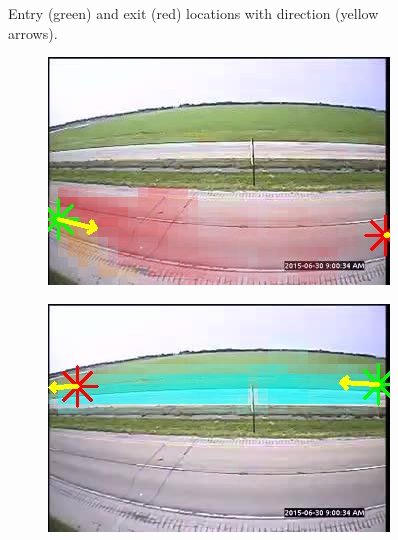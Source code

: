 \begin{figure}
\begin{subfigure}{0.32\linewidth}
        \end{subfigure}
        \caption{Entry (green) and exit (red) locations with direction (yellow arrows).}
        \label{fig:entry-exit-app-1}
\end{figure}
\begin{figure}
    \centering
        \begin{subfigure}{0.32\linewidth}
            \includegraphics[width=\linewidth]{./img/scene_learning/res/245837/245837-0.jpg}
        \end{subfigure}
        \begin{subfigure}{0.32\linewidth}
            \includegraphics[width=\linewidth]{./img/scene_learning/res/245837/245837-1.jpg}
        \end{subfigure}
        \begin{subfigure}{0.32\linewidth}

\end{subfigure}
\end{figure}
